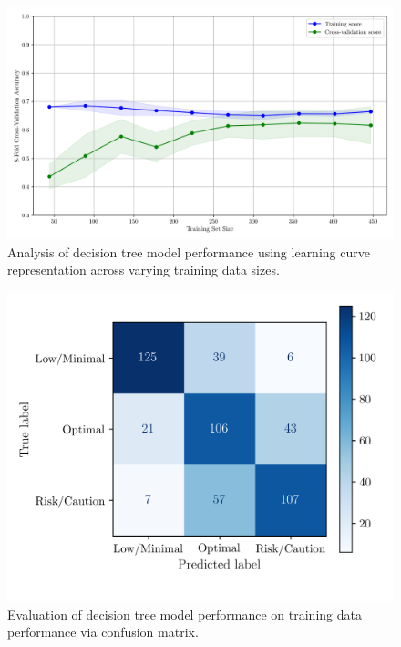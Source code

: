 \documentclass[conference]{IEEEtran}
\begin{document}
\begin{figure}[H]
    \centering
    \includegraphics[width=1\linewidth]{assets/DTREE_LearningCurve.png}
    \caption{Analysis of decision tree model performance using learning curve representation across varying training data sizes.}
    \label{dtree_lcurve}
\end{figure}

\begin{figure}[H]
    \centering
    \includegraphics[width=1\linewidth]{assets/DTREE_ConfusionMatrixTrain.png}
    \caption{Evaluation of decision tree model performance on training data performance via confusion matrix.}
    \label{dtree_cmtrain}
\end{figure}
\end{document}
